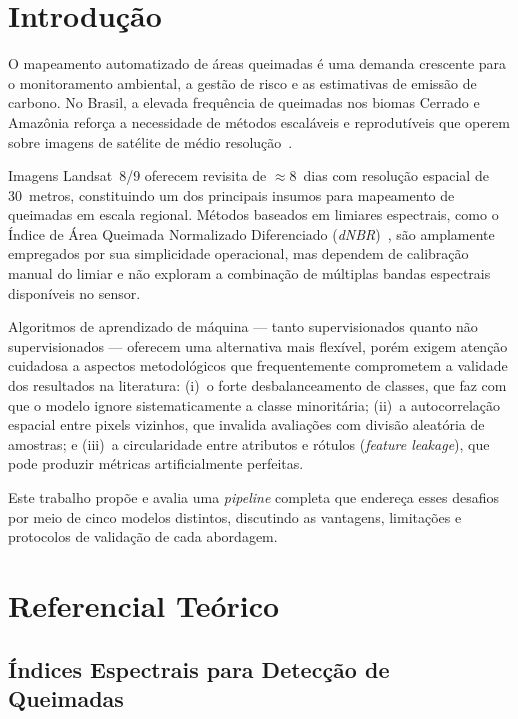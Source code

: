 \documentclass[conference]{IEEEtran}
\begin{document}
\section{Introdução}

O mapeamento automatizado de áreas queimadas é uma demanda crescente para
o monitoramento ambiental, a gestão de risco e as estimativas de emissão
de carbono. No Brasil, a elevada frequência de queimadas nos biomas Cerrado
e Amazônia reforça a necessidade de métodos escaláveis e reprodutíveis que
operem sobre imagens de satélite de médio resolução~\cite{b1}.

Imagens Landsat~8/9 oferecem revisita de $\approx8$~dias com resolução
espacial de 30~metros, constituindo um dos principais insumos para
mapeamento de queimadas em escala regional. Métodos baseados em limiares
espectrais, como o Índice de Área Queimada Normalizado Diferenciado
(\textit{dNBR})~\cite{b2}, são amplamente empregados por sua simplicidade
operacional, mas dependem de calibração manual do limiar e não exploram a
combinação de múltiplas bandas espectrais disponíveis no sensor.

Algoritmos de aprendizado de máquina — tanto supervisionados quanto não
supervisionados — oferecem uma alternativa mais flexível, porém exigem
atenção cuidadosa a aspectos metodológicos que frequentemente comprometem
a validade dos resultados na literatura: (i)~o forte desbalanceamento de
classes, que faz com que o modelo ignore sistematicamente a classe
minoritária; (ii)~a autocorrelação espacial entre pixels vizinhos, que
invalida avaliações com divisão aleatória de amostras; e (iii)~a
circularidade entre atributos e rótulos (\textit{feature leakage}), que
pode produzir métricas artificialmente perfeitas.

Este trabalho propõe e avalia uma \textit{pipeline} completa que endereça
esses desafios por meio de cinco modelos distintos, discutindo as vantagens,
limitações e protocolos de validação de cada abordagem.

\section{Referencial Teórico}

\subsection{Índices Espectrais para Detecção de Queimadas}
\end{document}
